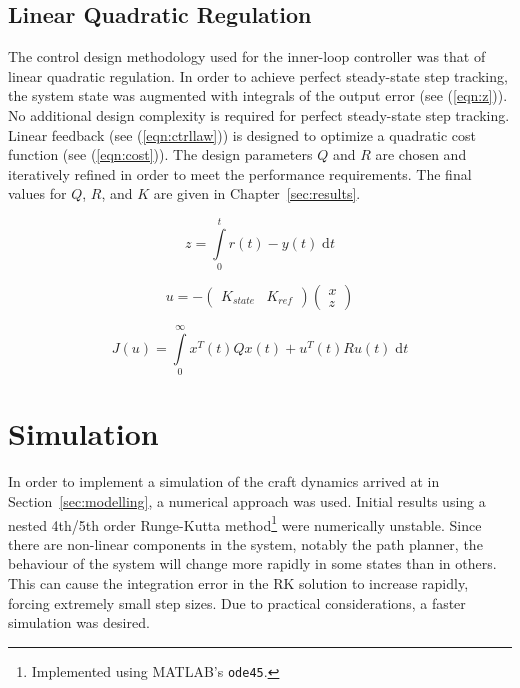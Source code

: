 \documentclass{sydeStyle}
\begin{document}
\subsection{Linear Quadratic Regulation}
The control design methodology used for the inner-loop controller was that of
linear quadratic regulation.  In order to achieve perfect steady-state step
tracking, the system state was augmented with integrals of the output error (see
(\ref{eqn:z})).  No additional design complexity is required for perfect
steady-state step tracking.  Linear feedback (see (\ref{eqn:ctrllaw})) is
designed to optimize a quadratic cost function (see (\ref{eqn:cost})).  The
design parameters $Q$ and $R$ are chosen and iteratively refined in order to
meet the performance requirements.  The final values for $Q$, $R$, and $K$ are
given in Chapter~\ref{sec:results}.

\begin{equation}
    z = \int\limits_0^t r(t) - y(t) \; \textrm{d}t
    \label{eqn:z}
\end{equation}

\begin{equation}
    u
    =
    -
    \begin{pmatrix}
        K_{state} & K_{ref}
    \end{pmatrix}
    \begin{pmatrix}
        x \\ z
    \end{pmatrix}
    \label{eqn:ctrllaw}
\end{equation}

\begin{equation}
    J(u) = \int\limits_0^\infty x^T(t)Qx(t) + u^T(t)Ru(t) \; \textrm{d}t
    \label{eqn:cost}
\end{equation}

\section{Simulation}
\label{sec:simulation}
In order to implement a simulation of the craft dynamics arrived at in
Section~\ref{sec:modelling}, a numerical approach was used.  Initial results
using a nested 4th/5th order Runge-Kutta method\footnote{Implemented using
MATLAB's \texttt{ode45}.} were numerically unstable.  Since there are non-linear
components in the system, notably the path planner, the behaviour of the system
will change more rapidly in some states than in others.  This can cause the
integration error in the RK solution to increase rapidly, forcing extremely
small step sizes.  Due to practical considerations, a faster simulation was
desired.
\end{document}
